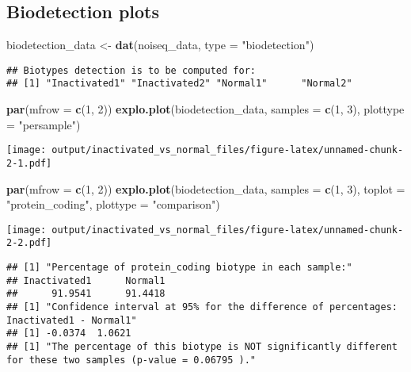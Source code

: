 \documentclass[]{article}
\newenvironment{Shaded}{\begin{snugshade}}{\end{snugshade}}
\newcommand{\KeywordTok}[1]{\textcolor[rgb]{0.13,0.29,0.53}{\textbf{#1}}}
\newcommand{\DataTypeTok}[1]{\textcolor[rgb]{0.13,0.29,0.53}{#1}}
\newcommand{\DecValTok}[1]{\textcolor[rgb]{0.00,0.00,0.81}{#1}}
\newcommand{\StringTok}[1]{\textcolor[rgb]{0.31,0.60,0.02}{#1}}
\newcommand{\NormalTok}[1]{#1}
\begin{document}
\subsection{Biodetection plots}\label{biodetection-plots}

\begin{Shaded}
\begin{Highlighting}[]
\NormalTok{biodetection_data <-}\StringTok{ }\KeywordTok{dat}\NormalTok{(noiseq_data, }\DataTypeTok{type =} \StringTok{"biodetection"}\NormalTok{)}
\end{Highlighting}
\end{Shaded}

\begin{verbatim}
## Biotypes detection is to be computed for:
## [1] "Inactivated1" "Inactivated2" "Normal1"      "Normal2"
\end{verbatim}

\begin{Shaded}
\begin{Highlighting}[]
\KeywordTok{par}\NormalTok{(}\DataTypeTok{mfrow =} \KeywordTok{c}\NormalTok{(}\DecValTok{1}\NormalTok{, }\DecValTok{2}\NormalTok{))}
\KeywordTok{explo.plot}\NormalTok{(biodetection_data, }\DataTypeTok{samples =} \KeywordTok{c}\NormalTok{(}\DecValTok{1}\NormalTok{, }\DecValTok{3}\NormalTok{), }\DataTypeTok{plottype =} \StringTok{"persample"}\NormalTok{)}
\end{Highlighting}
\end{Shaded}

\texttt{[image: output/inactivated\_vs\_normal\_files/figure-latex/unnamed-chunk-2-1.pdf]}

\begin{Shaded}
\begin{Highlighting}[]
\KeywordTok{par}\NormalTok{(}\DataTypeTok{mfrow =} \KeywordTok{c}\NormalTok{(}\DecValTok{1}\NormalTok{, }\DecValTok{2}\NormalTok{))}
\KeywordTok{explo.plot}\NormalTok{(biodetection_data, }\DataTypeTok{samples =} \KeywordTok{c}\NormalTok{(}\DecValTok{1}\NormalTok{, }\DecValTok{3}\NormalTok{), }\DataTypeTok{toplot =} \StringTok{"protein_coding"}\NormalTok{, }\DataTypeTok{plottype =} \StringTok{"comparison"}\NormalTok{)}
\end{Highlighting}
\end{Shaded}

\texttt{[image: output/inactivated\_vs\_normal\_files/figure-latex/unnamed-chunk-2-2.pdf]}

\begin{verbatim}
## [1] "Percentage of protein_coding biotype in each sample:"
## Inactivated1      Normal1 
##      91.9541      91.4418 
## [1] "Confidence interval at 95% for the difference of percentages: Inactivated1 - Normal1"
## [1] -0.0374  1.0621
## [1] "The percentage of this biotype is NOT significantly different for these two samples (p-value = 0.06795 )."
\end{verbatim}
\end{document}
